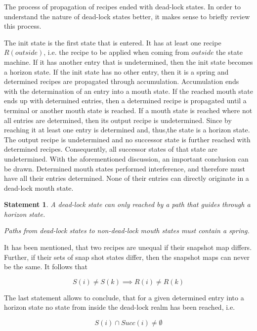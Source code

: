 \documentclass[12pt,a4paper]{scrartcl}
\newtheorem{statement}{Statement}
\begin{document}
The process of propagation of recipes ended with dead-lock states. In order
to understand the nature of dead-lock states better, it makes sense to briefly
review this process. 

The init state is the first state that is entered. It has at least one recipe
$R(outside)$, i.e. the recipe to be applied when coming from $outside$ the
state machine. If it has another entry that is undetermined, then the init
state becomes a horizon state. If the init state has no other entry, then it is
a spring and determined recipes are propagated through accumulation.
Accumulation ends with the determination of an entry into a mouth state. If the
reached mouth state ends up with determined entries, then a determined recipe
is propagated until a terminal or another mouth state is reached. If a mouth
state is reached where not all entries are determined, then its output recipe
is undetermined. Since by reaching it at least one entry is determined and,
thus,the state is a horizon state. The output recipe is undetermined and no
successor state is further reached with determined recipes. Consequently, all
successor states of that state are undetermined.  With the aforementioned
discussion, an important conclusion can be drawn.  Determined mouth states 
performed interference, and therefore must have all their entries determined. 
None of their entries can directly originate in a dead-lock mouth state.

\begin{statement}
A dead-lock state can only reached by a path that guides through a horizon
state. 

Paths from dead-lock states to non-dead-lock mouth states must contain a
spring.
\end{statement}
   
It has been mentioned, that two recipes are unequal if their snapshot map
differs.  Further, if their sets of snap shot states differ, then the snapshot
maps can never be the same. It follows that

\begin{equation}
    S(i) \neq S(k) \implies R(i) \neq R(k)
\end{equation}

The last statement allows to conclude, that for a given determined entry into a
horizon state no state from inside the dead-lock realm has been reached, i.e.

\begin{equation}
    S(i) \cap Succ(i) \neq \emptyset
\end{equation}
\end{document}
